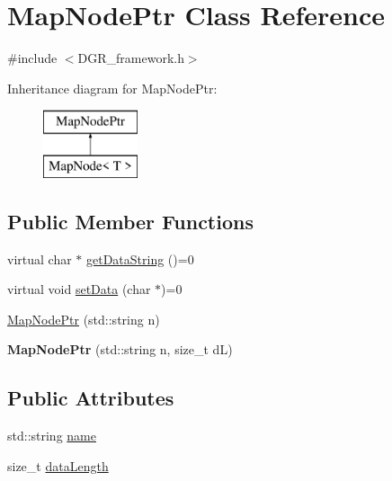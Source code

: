 \hypertarget{classMapNodePtr}{\section{Map\+Node\+Ptr Class Reference}
\label{classMapNodePtr}
}


{\ttfamily \#include $<$D\+G\+R\+\_\+framework.\+h$>$}

Inheritance diagram for Map\+Node\+Ptr\+:\begin{figure}[H]
\begin{center}
\leavevmode
\includegraphics[height=2.000000cm]{classMapNodePtr}
\end{center}
\end{figure}
\subsection*{Public Member Functions}
\begin{DoxyCompactItemize}
\item 
virtual char $\ast$ \hyperlink{classMapNodePtr_a2d7366a2f34c69877a05e8afbaa92d01}{get\+Data\+String} ()=0
\item 
virtual void \hyperlink{classMapNodePtr_aefd9101ca6bee00cd3304e72b2ca50bb}{set\+Data} (char $\ast$)=0
\item 
\hyperlink{classMapNodePtr_ace653557c82003ba13ad9aa663bdc25f}{Map\+Node\+Ptr} (std\+::string n)
\item 
\hypertarget{classMapNodePtr_ab5ed81d4fe235d9df10a66088ed1ef76}{{\bfseries Map\+Node\+Ptr} (std\+::string n, size\+\_\+t d\+L)}\label{classMapNodePtr_ab5ed81d4fe235d9df10a66088ed1ef76}

\end{DoxyCompactItemize}
\subsection*{Public Attributes}
\begin{DoxyCompactItemize}
\item 
std\+::string \hyperlink{classMapNodePtr_a928378e3e8b1661858463cedc8e721c9}{name}
\item 
size\+\_\+t \hyperlink{classMapNodePtr_ac90162a897b772218843f49b4b08dc06}{data\+Length}
\end{DoxyCompactItemize}


